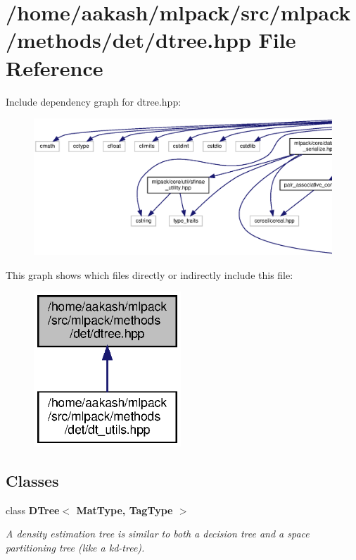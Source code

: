 \section{/home/aakash/mlpack/src/mlpack/methods/det/dtree.hpp File Reference}
\label{dtree_8hpp}
Include dependency graph for dtree.\+hpp\+:
\nopagebreak
\begin{figure}[H]
\begin{center}
\leavevmode
\includegraphics[width=350pt]{dtree_8hpp__incl}
\end{center}
\end{figure}
This graph shows which files directly or indirectly include this file\+:
\nopagebreak
\begin{figure}[H]
\begin{center}
\leavevmode
\includegraphics[width=157pt]{dtree_8hpp__dep__incl}
\end{center}
\end{figure}
\subsection*{Classes}
\begin{DoxyCompactItemize}
\item 
class \textbf{ D\+Tree$<$ Mat\+Type, Tag\+Type $>$}
\begin{DoxyCompactList}\small\item\em A density estimation tree is similar to both a decision tree and a space partitioning tree (like a kd-\/tree). \end{DoxyCompactList}\end{DoxyCompactItemize}
